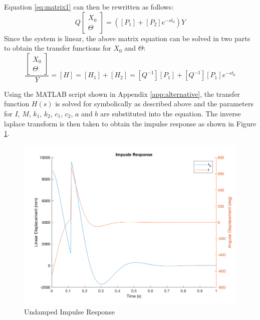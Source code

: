 \documentclass[12pt]{article}
\begin{document}
Equation \ref{eq:matrix1} can then be rewritten as follows:
\begin{equation}
	\label{eq:matrix1}
	Q
	\begin{bmatrix} 
	X_0 \\
	\Theta 
	\end{bmatrix}
	= 
	\left(\left[P_1\right]+\left[P_2\right]e^{-st_0}\right)Y
\end{equation}
Since the system is linear, the above matrix equation can be solved in two parts to obtain the transfer functions for $X_0$ and $\Theta$:
\begin{equation}
	\frac{\begin{bmatrix} 
		X_0 \\
		\Theta 
	\end{bmatrix}}{Y} =
	\left[H\right] = 
	\left[H_1\right] + \left[H_2\right] = 
	[Q^{-1}][P_1] + [Q^{-1}][P_1]e^{-st_0} 
\end{equation} 

Using the MATLAB script shown in Appendix \ref{app:alternative}, the transfer function $H(s)$ is solved for symbolically as described above and the parameters for $I$, $M$, $k_1$, $k_2$, $c_1$, $c_2$, $a$ and $b$ are substituted into the equation. The inverse laplace transform is then taken to obtain the impulse response as shown in Figure \ref{fig:impResp}.
\begin{figure}[h!]
	\centering
	\includegraphics[width=.8\textwidth]{./matlab/impResp.png}
	\caption{Undamped Impulse Response}
	\label{fig:impResp}
\end{figure}
\end{document}
